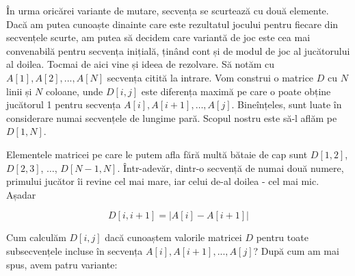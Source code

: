 În urma oricărei variante de mutare, secvența se scurtează cu două
elemente. Dacă am putea cunoaște dinainte care este rezultatul jocului pentru
fiecare din secvențele scurte, am putea să decidem care variantă de joc este
cea mai convenabilă pentru secvența inițială, ținând cont și de modul de joc
al jucătorului al doilea. Tocmai de aici vine și ideea de rezolvare. Să notăm
cu $A[1], A[2], ..., A[N]$ secvența citită la intrare. Vom construi o
matrice $D$ cu $N$ linii și $N$ coloane, unde $D[i,j]$ este diferența maximă
pe care o poate obține jucătorul 1 pentru secvența $A[i], A[i+1], \dots,
A[j]$. Bineînțeles, sunt luate în considerare numai secvențele de lungime
pară. Scopul nostru este să-l aflăm pe $D[1,N]$.

Elementele matricei pe care le putem afla fără multă bătaie de cap sunt
$D[1,2]$, $D[2,3]$, $\dots$, $D[N-1,N]$. Într-adevăr, dintr-o secvență de
numai două numere, primului jucător îi revine cel mai mare, iar celui de-al
doilea - cel mai mic. Așadar

\begin{equation}
  D[i,i + 1] = |A[i] - A[i + 1]|
\end{equation}

Cum calculăm $D[i,j]$ dacă cunoaștem valorile matricei $D$ pentru toate
subsecvențele incluse în secvența $A[i], A[i+1], ..., A[j]$? După cum am mai
spus, avem patru variante:


